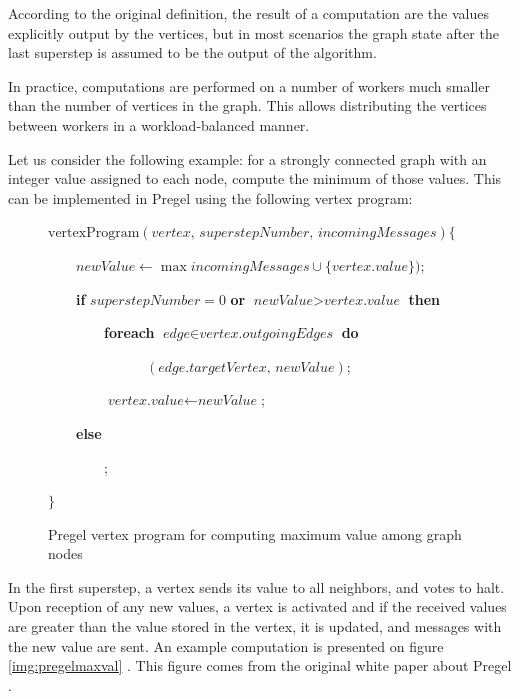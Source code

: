 According to the original definition, the result of a computation are the values explicitly output by the vertices, but in most scenarios the graph state after the last superstep is assumed to be the output of the algorithm.

In practice, computations are performed on a number of workers much smaller than the number of vertices in the graph. This allows distributing the vertices between workers in a workload-balanced manner.

Let us consider the following example: for a strongly connected graph with an integer value assigned to each node, compute the minimum of those values. This can be implemented in Pregel using the following vertex program:

\begin{figure}[h!]
\parbox{0.8\textwidth}{
$\text{vertexProgram}(\textit{vertex, superstepNumber, incomingMessages}) \{$

~~~~$\textit{newValue} \leftarrow \max\textit{incomingMessages} \cup \{\textit{vertex.value}\})$;

~~~~\textbf{if} $superstepNumber = 0$ \textbf{or} $\textit{newValue} > \textit{vertex.value}$ \textbf{then}

~~~~~~~~\textbf{foreach} $\textit{edge} \in \textit{vertex.outgoingEdges}$ \textbf{do}

~~~~~~~~~~~~~~$(\textit{edge.targetVertex, newValue})$;

~~~~~~~~$\textit{vertex.value} \leftarrow \textit{newValue}$;

~~~~\textbf{else}

~~~~~~~~;

$\}$
}
\caption{Pregel vertex program for computing maximum value among graph nodes}\label{ss:pregelmaxval}
\end{figure}

In the first superstep, a vertex sends its value to all neighbors, and votes to halt. Upon reception of any new values, a vertex is activated and if the received values are greater than the value stored in the vertex, it is updated, and messages with the new value are sent. An example computation is presented on figure \ref{img:pregelmaxval} . This figure comes from the original white paper about Pregel \cite{pregel}.

